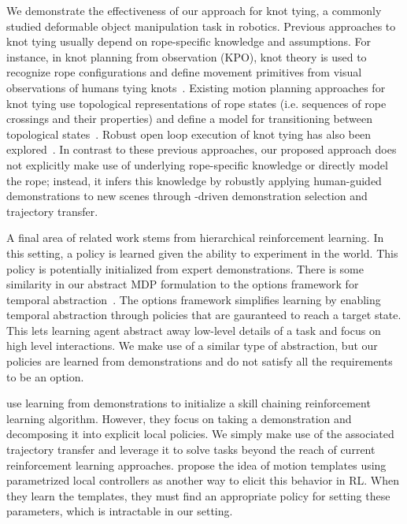 We demonstrate the effectiveness of our approach for
knot tying, a commonly studied deformable object manipulation task in robotics.
Previous approaches to knot tying usually depend on rope-specific knowledge
and assumptions.
For instance, in knot planning from observation (KPO), knot theory is used
to recognize rope configurations and define
movement primitives from visual observations of humans tying
knots~\cite{Morita_ICRA2003, Takamatsu_TransRob2006}.
Existing motion planning approaches for knot tying use topological
representations of rope states (i.e. sequences of rope crossings and their
properties) and define a model for transitioning between topological
states~\cite{Moll_IEEERobot2006, Saha_ExpRobotics2008, Wakamatsu_IJRR2006}.
Robust open loop execution of knot tying has also been explored~\cite{Bell_PhD2010}.
In contrast to these previous approaches, our proposed approach does not
explicitly make use of underlying rope-specific
knowledge or directly model the rope; instead, it infers this knowledge by
robustly applying human-guided demonstrations to new scenes through
\mmql{}-driven demonstration selection and trajectory transfer.

A final area of related work stems from hierarchical reinforcement learning. 
In this setting, a policy is learned given the ability to experiment in the world.
This policy is potentially initialized from expert demonstrations.
There is some similarity in our abstract MDP formulation to the options 
framework for temporal abstraction~\cite{sutton1999between}.
The options framework simplifies learning by enabling temporal abstraction through
policies that are gauranteed to reach a target state. 
This lets learning agent abstract away low-level details of a task and focus on 
high level interactions. 
We make use of a similar type of abstraction, but our policies are learned from 
demonstrations and do not satisfy all the requirements to be an option.

\citet{konidaris2010constructing} use learning from demonstrations to initialize a skill chaining reinforcement learning algorithm.
However, they focus on taking a demonstration and decomposing it into explicit local policies.
We simply make use of the associated trajectory transfer and leverage it to solve tasks beyond the reach of current reinforcement learning approaches.
\citet{Neumann09learningcomplex} propose the idea of motion templates using parametrized local controllers as another way to elicit this behavior in RL.
When they learn the templates, they must find an appropriate policy for setting these parameters, which is intractable in our setting.
